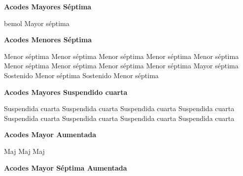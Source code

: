 \clearpage
\textbf{Acodes Mayores S\'eptima}
\vskip 25pt

\small
{} \qquad\qquad {} \qquad\qquad {} \qquad\qquad
\vskip 25pt
 \qquad\qquad {} \qquad\qquad {}
\vskip 25pt
  \qquad\qquad {} bemol Mayor s\'eptima
\vskip 25pt
 \qquad\qquad
\normalsize
\vskip 20pt

\textbf{Acodes Menores S\'eptima}
\vskip 25pt

\small
{} Menor s\'eptima \qquad\qquad
{} Menor s\'eptima \qquad\qquad
{} Menor s\'eptima
\vskip 25pt
 Menor s\'eptima \qquad\qquad
{} Menor s\'eptima \qquad\qquad
{} Menor s\'eptima
\vskip 25pt
 Menor s\'eptima \qquad\qquad
{} Menor s\'eptima \qquad\qquad
{} Menor s\'eptima
\vskip 25pt
 Mayor s\'eptima \qquad\qquad
{} Sostenido Menor s\'eptima \qquad\qquad
{} Sostenido Menor s\'eptima
\normalsize

\vskip 20pt

\textbf{Acodes Mayores Suspendido cuarta}
\vskip 25pt

\small
{} Suspendida cuarta  \qquad\qquad
{} Suspendida cuarta \qquad\qquad
{} Suspendida cuarta
\vskip 25pt
 Suspendida cuarta \qquad\qquad
{} Suspendida cuarta \qquad\qquad
{} Suspendida cuarta
\vskip 25pt
 Suspendida cuarta \qquad\qquad
{} Suspendida cuarta
\normalsize

\vskip 20pt
\textbf{Acodes Mayor Aumentada}
\vskip 25pt

\small
{} Maj  \qquad\qquad
{} Maj
 Maj
\normalsize

\vskip 20pt
\textbf{Acodes Mayor S\'eptima Aumentada}
\vskip 25pt

